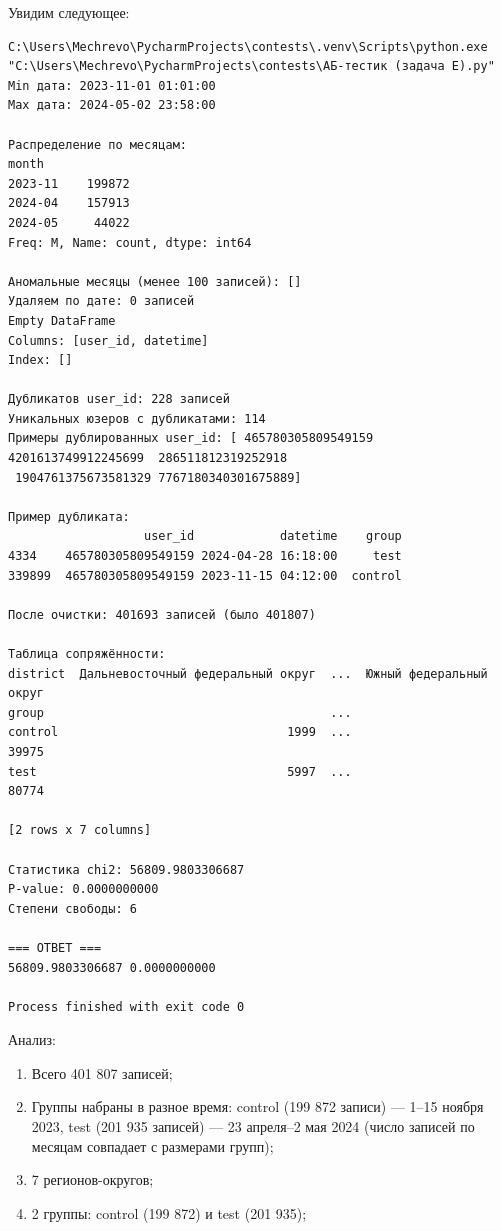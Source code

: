 \documentclass[pract]{SCWorks}
\begin{document}
Увидим следующее:

\begin{Verbatim}[fontsize=\small, breaklines=true, breaksymbol={\tiny\ensuremath{\hookrightarrow}}]
C:\Users\Mechrevo\PycharmProjects\contests\.venv\Scripts\python.exe "C:\Users\Mechrevo\PycharmProjects\contests\АБ-тестик (задача E).py" 
Min дата: 2023-11-01 01:01:00
Max дата: 2024-05-02 23:58:00

Распределение по месяцам:
month
2023-11    199872
2024-04    157913
2024-05     44022
Freq: M, Name: count, dtype: int64

Аномальные месяцы (менее 100 записей): []
Удаляем по дате: 0 записей
Empty DataFrame
Columns: [user_id, datetime]
Index: []

Дубликатов user_id: 228 записей
Уникальных юзеров с дубликатами: 114
Примеры дублированных user_id: [ 465780305809549159 4201613749912245699  286511812319252918
 1904761375673581329 7767180340301675889]

Пример дубликата:
                   user_id            datetime    group
4334    465780305809549159 2024-04-28 16:18:00     test
339899  465780305809549159 2023-11-15 04:12:00  control

После очистки: 401693 записей (было 401807)

Таблица сопряжённости:
district  Дальневосточный федеральный округ  ...  Южный федеральный округ
group                                        ...                         
control                                1999  ...                    39975
test                                   5997  ...                    80774

[2 rows x 7 columns]

Статистика chi2: 56809.9803306687
P-value: 0.0000000000
Степени свободы: 6

=== ОТВЕТ ===
56809.9803306687 0.0000000000

Process finished with exit code 0
\end{Verbatim}

Анализ:

\begin{enumerate}
    \item Всего 401 807 записей;
    \item Группы набраны в разное время: control (199 872 записи) --- 1--15 ноября 2023, test (201 935 записей)
    --- 23 апреля--2 мая 2024 (число записей по месяцам совпадает с размерами групп);
    \item 7 регионов-округов;
    \item 2 группы: control (199 872) и test (201 935);
\end{enumerate}
\end{document}
